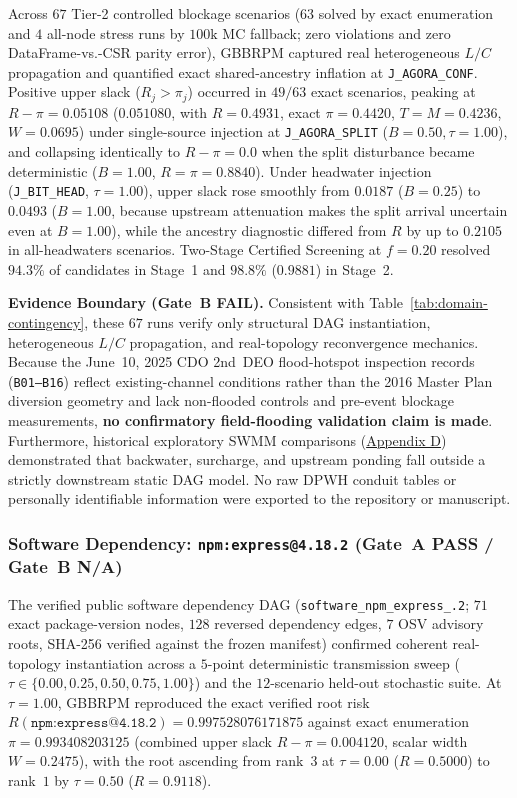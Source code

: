Across $67$ Tier-2 controlled blockage scenarios ($63$ solved by exact
enumeration and $4$ all-node stress runs by $100\text{k}$ MC fallback;
zero violations and zero DataFrame-vs.-CSR parity error), GBBRPM
captured real heterogeneous $L/C$ propagation and quantified exact
shared-ancestry inflation at \texttt{J\_AGORA\_CONF}. Positive upper
slack ($R_j > \pi_j$) occurred in $49/63$ exact scenarios, peaking at
$R - \pi = 0.05108$ ($0.051080$, with $R = 0.4931$, exact $\pi = 0.4420$,
$T = M = 0.4236$, $W = 0.0695$) under single-source injection at
\texttt{J\_AGORA\_SPLIT} ($B = 0.50, \tau = 1.00$), and collapsing
identically to $R - \pi = 0.0$ when the split disturbance became
deterministic ($B = 1.00$, $R = \pi = 0.8840$). Under headwater
injection (\texttt{J\_BIT\_HEAD}, $\tau=1.00$), upper slack rose
smoothly from $0.0187$ ($B=0.25$) to $0.0493$ ($B=1.00$, because
upstream attenuation makes the split arrival uncertain even at $B=1.00$),
while the ancestry diagnostic differed from $R$ by up to $0.2105$ in
all-headwaters scenarios. Two-Stage Certified Screening at $f=0.20$
resolved $94.3\%$ of candidates in Stage~1 and $98.8\%$ ($0.9881$) in
Stage~2.

\textbf{Evidence Boundary (Gate~B FAIL).} Consistent with
Table~\ref{tab:domain-contingency}, these $67$ runs verify only
structural DAG instantiation, heterogeneous $L/C$ propagation, and
real-topology reconvergence mechanics. Because the June~10, 2025 CDO
2nd~DEO flood-hotspot inspection records (\texttt{B01--B16}) reflect
existing-channel conditions rather than the 2016 Master Plan diversion
geometry and lack non-flooded controls and pre-event blockage
measurements, \textbf{no confirmatory field-flooding validation claim
is made}. Furthermore, historical exploratory SWMM comparisons
(\hyperref[app:preliminary]{Appendix D}) demonstrated that backwater,
surcharge, and upstream ponding fall outside a strictly downstream
static DAG model. No raw DPWH conduit tables or personally identifiable
information were exported to the repository or manuscript.

\subsubsection{Software Dependency: \texttt{npm:express@4.18.2} (Gate~A PASS / Gate~B N/A)}

The verified public software dependency DAG
(\texttt{software\_\allowbreak npm\_\allowbreak express\_.2}; $71$ exact package-version
nodes, $128$ reversed dependency edges, $7$ OSV advisory roots,
SHA-256 verified against the frozen manifest) confirmed coherent
real-topology instantiation across a $5$-point deterministic
transmission sweep ($\tau \in \{0.00, 0.25, 0.50, 0.75, 1.00\}$) and
the $12$-scenario held-out stochastic suite. At $\tau = 1.00$, GBBRPM
reproduced the exact verified root risk
$R(\texttt{npm:express@4.18.2}) = 0.997528076171875$ against exact
enumeration $\pi = 0.993408203125$ (combined upper slack
$R - \pi = 0.004120$, scalar width $W = 0.2475$), with the root
ascending from rank~$3$ at $\tau = 0.00$ ($R = 0.5000$) to rank~$1$ by
$\tau = 0.50$ ($R = 0.9118$).

